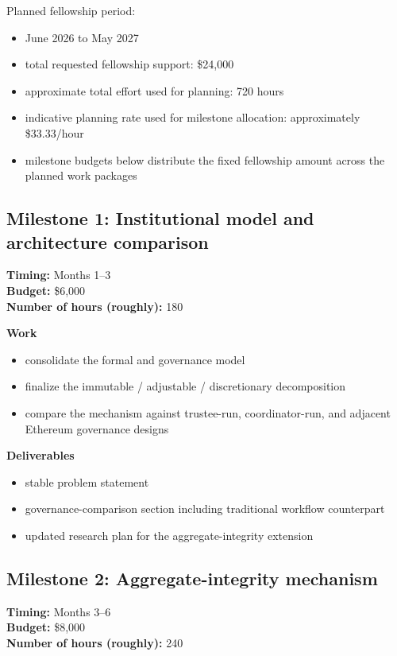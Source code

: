 \documentclass[11pt]{article}
\begin{document}
Planned fellowship period:

\begin{itemize}[leftmargin=*,nosep]
\item June 2026 to May 2027
\item total requested fellowship support: \$24{,}000
\item approximate total effort used for planning: 720 hours
\item indicative planning rate used for milestone allocation: approximately \$33.33/hour
\item milestone budgets below distribute the fixed fellowship amount across the planned work packages
\end{itemize}

\subsection*{Milestone 1: Institutional model and architecture comparison}

\textbf{Timing:} Months 1--3\\
\textbf{Budget:} \$6{,}000\\
\textbf{Number of hours (roughly):} 180

\textbf{Work}
\begin{itemize}[leftmargin=*,nosep]
\item consolidate the formal and governance model
\item finalize the immutable / adjustable / discretionary decomposition
\item compare the mechanism against trustee-run, coordinator-run, and adjacent
      Ethereum governance designs
\end{itemize}

\textbf{Deliverables}
\begin{itemize}[leftmargin=*,nosep]
\item stable problem statement
\item governance-comparison section including traditional workflow counterpart
\item updated research plan for the aggregate-integrity extension
\end{itemize}

\subsection*{Milestone 2: Aggregate-integrity mechanism}

\textbf{Timing:} Months 3--6\\
\textbf{Budget:} \$8{,}000\\
\textbf{Number of hours (roughly):} 240
\end{document}
